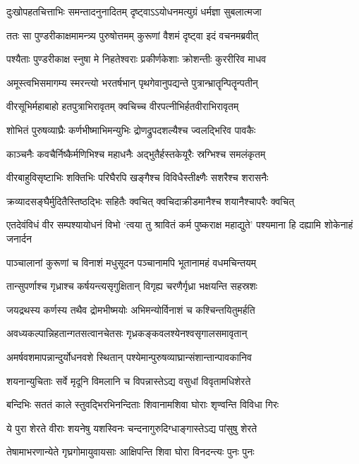 \twolineshloka
{दुःखोपहतचित्ताभिः समन्तादनुनादितम्}
{दृष्ट्वाऽऽयोधनमत्युग्रं धर्मज्ञा सुबलात्मजा}


\twolineshloka
{ततः सा पुण्डरीकाक्षमामन्त्र्य पुरुषोत्तमम्}
{कुरूणां वैशमं दृष्ट्वा इदं वचनमब्रवीत्}


\twolineshloka
{पश्यैताः पुण्डरीकाक्ष स्नुषा मे निहतेश्वराः}
{प्रकीर्णकेशाः क्रोशन्तीः कुररीरिव माधव}


\twolineshloka
{अमूस्त्वभिसमागम्य स्मरन्त्यो भरतर्षभान्}
{पृथगेवानुपद्यन्ते पुत्रान्भ्रातॄन्पितॄन्पतीन्}


\twolineshloka
{वीरसूभिर्महाबाहो हतपुत्राभिरावृतम्}
{क्वचिच्च वीरपत्नीभिर्हतवीराभिरावृतम्}


\twolineshloka
{शोभितं पुरुषव्याघ्रैः कर्णभीष्माभिमन्युभिः}
{द्रोणद्रुपदशल्यैश्च ज्वलद्भिरिव पावकैः}


\twolineshloka
{काञ्चनैः कवचैर्निष्कैर्मणिभिश्च महाधनैः}
{अद्भुतैर्हस्तकेयूरैः स्रग्भिश्च समलंकृतम्}


\twolineshloka
{वीरबाहुविसृष्टाभिः शक्तिभिः परिघैरपि}
{खङ्गैश्च विविधैस्तीक्ष्णैः सशरैश्च शरासनैः}


\twolineshloka
{क्रव्यादसङ्घैर्मुदितैस्तिष्ठद्भिः सहितैः क्वचित्}
{क्वचिदाक्रीडमानैश्च शयानैश्चापरैः क्वचित्}


\threelineshloka
{एतदेवंविधं वीर सम्पश्यायोधनं विभो}
{`त्वया तु श्रावितं कर्म पुष्कराक्ष महाद्युते'}
{पश्यमाना हि दह्यामि शोकेनाहं जनार्दन}


\twolineshloka
{पाञ्चालानां कुरूणां च विनाशं मधुसूदन}
{पञ्चानामपि भूतानामहं वधमचिन्तयम्}


\twolineshloka
{तान्सुपर्णाश्च गृध्राश्च कर्षयन्त्यसृगुक्षितान्}
{विगृह्य चरणैर्गृध्रा भक्षयन्ति सहस्रशः}


\twolineshloka
{जयद्रथस्य कर्णस्य तथैव द्रोमभीष्मयोः}
{अभिमन्योर्विनाशं च कश्चिन्तयितुमर्हति}


\twolineshloka
{अवध्यकल्पान्निहतान्गतसत्वानचेतसः}
{गृध्रकङ्कवलश्येनश्वसृगालसमावृतान्}


\twolineshloka
{अमर्षवशमापन्नान्दुर्योधनवशे स्थितान्}
{पश्येमान्पुरुषव्याघ्रान्संशान्तान्पावकानिव}


\twolineshloka
{शयनान्युचिताः सर्वे मृदूनि विमलानि च}
{विपन्नास्तेऽद्य वसुधां विवृतामधिशेरते}


\twolineshloka
{बन्दिभिः सततं काले स्तुवद्भिरभिनन्दिताः}
{शिवानामशिवा घोराः शृण्वन्ति विविधा गिरः}


\twolineshloka
{ये पुरा शेरते वीराः शयनेषु यशस्विनः}
{चन्दनागुरुदिग्धाङ्गास्तेऽद्य पांसुषु शेरते}


\twolineshloka
{तेषामाभरणान्येते गृघ्रगोमायुवायसाः}
{आक्षिपन्ति शिवा घोरा विनदन्त्यः पुनः पुनः}


